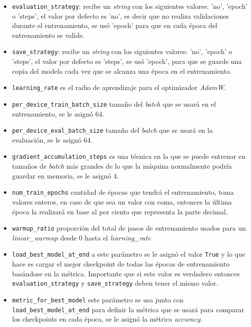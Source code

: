\begin{itemize}
    \item \texttt{evaluation\_strategy}: recibe un \textit{string} con los siguientes valores: 'no', 'epoch' o 'steps', el valor por defecto es 'no', es decir que no realiza validaciones durante el entrenamiento, se usó 'epoch' para que en cada época del entrenamiento se valide.
    \item \texttt{save\_strategy}: recibe un \textit{string} con los siguientes valores: 'no', 'epoch' o 'steps', el valor por defecto es 'steps', se usó 'epoch', para que se guarde una copia del modelo cada vez que se alcanza una época en el entrenamiento.
    \item \texttt{learning\_rate} es el radio de aprendizaje para el optimizador \textit{AdamW}.
    \item \texttt{per\_device\_train\_batch\_size} tamaño del \textit{batch} que se usará en el entrenamiento, se le asignó 64.
    \item \texttt{per\_device\_eval\_batch\_size} tamaño del \textit{batch} que se usará en la evaluación, se le asignó 64.
    \item \texttt{gradient\_accumulation\_steps} es una técnica en la que se puede entrenar en tamaños de \textit{batch} más grandes de lo que la máquina normalmente podría guardar en memoria, se le asignó 4.
    \item \texttt{num\_train\_epochs} cantidad de épocas que tendrá el entrenamiento, toma valores enteros, en caso de que sea un valor con coma, entonces la última época la realizará en base al por ciento que representa la parte decimal.
    \item \texttt{warmup\_ratio} proporción del total de pasos de entrenamiento usados para un \textit{linear\_warmup} desde 0 hasta el \textit{learning\_rate}
    \item \texttt{load\_best\_model\_at\_end} a este parámetro se le asignó el valor \texttt{True} y lo que hace es cargar el mejor checkpoint de todas las épocas de entrenamiento basándose en la métrica. Importante que si este valor es verdadero entonces \texttt{evaluation\_strategy} y \texttt{save\_strategy} deben tener el mismo valor.
    \item \texttt{metric\_for\_best\_model} este parámetro se usa junto con \texttt{load\_best\_model\_at\_end} para definir la métrica que se usará para comparar los checkpoints en cada época, se le asignó la métrica \textit{accuracy}.
\end{itemize}

